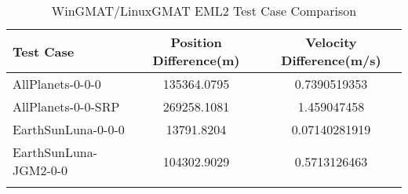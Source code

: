 \begin{table}[htbp!]
\centering
\caption{ WinGMAT/LinuxGMAT EML2 Test Case Comparison}
      \begin{tabular}{lcc}
      \hline\hline
          Test Case & Position Difference(m) & Velocity Difference(m/s) \\
         \hline
         AllPlanets-0-0-0 & 135364.0795 & 0.7390519353 \\
         AllPlanets-0-0-SRP & 269258.1081 & 1.459047458 \\
         EarthSunLuna-0-0-0 & 13791.8204 & 0.07140281919 \\
         EarthSunLuna-JGM2-0-0 & 104302.9029 & 0.5713126463 \\
      \hline\hline
      \label{Table: EML2 WinGMAT-LinuxGMAT Table} 
\end{tabular}
\end{table}
